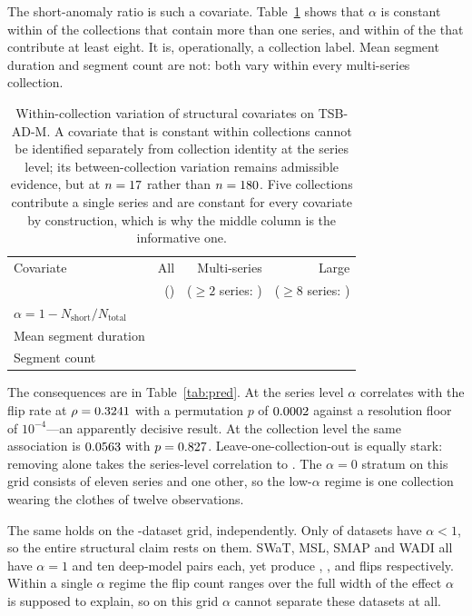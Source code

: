 \documentclass[twoside,11pt]{article}
\begin{document}
The short-anomaly ratio is such a covariate. Table~\ref{tab:ident} shows that
$\alpha$ is constant within \ConstMultiAlpha{} of the \NMultiCollections{}
collections that contain more than one series, and within \ConstBigAlpha{} of
the \NBigCollections{} that contribute at least eight. It is, operationally, a
collection label. Mean segment duration and segment count are not: both vary
within every multi-series collection.

\begin{table}[t]
\centering
\caption{Within-collection variation of structural covariates on TSB-AD-M. A
covariate that is constant within collections cannot be identified separately
from collection identity at the series level; its between-collection variation
remains admissible evidence, but at $n = 17{}$ rather than
$n = 180{}$. Five collections contribute a single series and are
constant for every covariate by construction, which is why the middle column is
the informative one.}
\label{tab:ident}
\begin{tabular}{lrrr}
\toprule
Covariate & All & Multi-series & Large \\
          & (\TsbadCollections{}) & ($\geq 2$ series: \NMultiCollections{}) & ($\geq 8$ series: \NBigCollections{}) \\
\midrule
$\alpha = 1 - N_{\text{short}}/N_{\text{total}}$ & \ConstAlpha{} & \ConstMultiAlpha{} & \ConstBigAlpha{} \\
Mean segment duration & \ConstDur{} & \ConstMultiDur{} & \ConstBigDur{} \\
Segment count & \ConstNseg{} & \ConstMultiNseg{} & \ConstBigNseg{} \\
\bottomrule
\end{tabular}
\end{table}

The consequences are in Table~\ref{tab:pred}. At the series level $\alpha$
correlates with the flip rate at $\rho = 0.3241{}$ with a permutation $p$
of $0.0002{}$ against a resolution floor of $10^{-4}$---an apparently
decisive result. At the
collection level the same association is $0.0563{}$ with
$p = 0.827{}$. Leave-one-collection-out is equally stark: removing
\LocoAlphaWorst{} alone takes the series-level correlation to
\LocoAlphaMin{}. The $\alpha = 0$ stratum on this grid consists of eleven
\LocoAlphaWorst{} series and one other, so the low-$\alpha$ regime is one
collection wearing the clothes of twelve observations.

The same holds on the \TabDatasets-dataset grid, independently. Only
\TabAlphaLtOne{} of \TabDatasets{} datasets have $\alpha < 1$, so the entire
structural claim rests on them. SWaT, MSL, SMAP and WADI all have $\alpha = 1$
and ten deep-model pairs each, yet produce \DeepSWaTFlips{}, \DeepMSLFlips{},
\DeepSMAPFlips{} and \DeepWADIFlips{} flips respectively. Within a single
$\alpha$ regime the flip count ranges over the full width of the effect
$\alpha$ is supposed to explain, so on this grid $\alpha$ cannot separate these
datasets at all.
\end{document}
